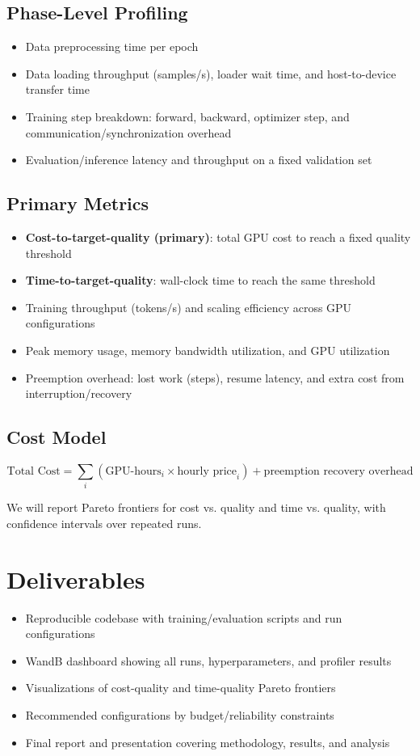 \documentclass{article}
\begin{document}
\subsection*{Phase-Level Profiling}
\begin{itemize}
    \item Data preprocessing time per epoch
    \item Data loading throughput (samples/s), loader wait time, and host-to-device transfer time
    \item Training step breakdown: forward, backward, optimizer step, and communication/synchronization overhead
    \item Evaluation/inference latency and throughput on a fixed validation set
\end{itemize}

\subsection*{Primary Metrics}
\begin{itemize}
    \item \textbf{Cost-to-target-quality (primary)}: total GPU cost to reach a fixed quality threshold
    \item \textbf{Time-to-target-quality}: wall-clock time to reach the same threshold
    \item Training throughput (tokens/s) and scaling efficiency across GPU configurations
    \item Peak memory usage, memory bandwidth utilization, and GPU utilization
    \item Preemption overhead: lost work (steps), resume latency, and extra cost from interruption/recovery
\end{itemize}

\subsection*{Cost Model}
\[
\text{Total Cost} = \sum_i (\text{GPU-hours}_i \times \text{hourly price}_i) + \text{preemption recovery overhead}
\]
\par We will report Pareto frontiers for cost vs. quality and time vs. quality, with confidence intervals over repeated runs.


\section{Deliverables}
\begin{itemize}
    \item Reproducible codebase with training/evaluation scripts and run configurations
    \item WandB dashboard showing all runs, hyperparameters, and profiler results
    \item Visualizations of cost-quality and time-quality Pareto frontiers
    \item Recommended configurations by budget/reliability constraints
    \item Final report and presentation covering methodology, results, and analysis
\end{itemize}
\end{document}
